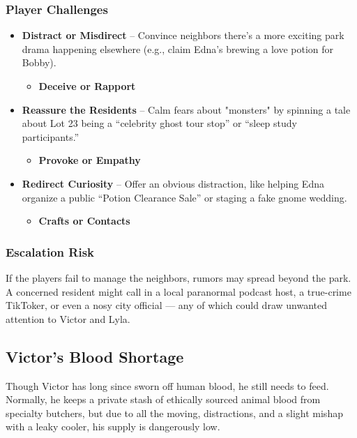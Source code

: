 \subsubsection*{Player Challenges}
\begin{itemize}
    \item \textbf{Distract or Misdirect} – Convince neighbors there’s a more exciting park drama happening elsewhere (e.g., claim Edna’s brewing a love potion for Bobby).
        \begin{itemize}
            \item \textbf{Deceive or Rapport} 
        \end{itemize}

    \item \textbf{Reassure the Residents} – Calm fears about "monsters" by spinning a tale about Lot 23 being a “celebrity ghost tour stop” or “sleep study participants.”
        \begin{itemize}
            \item \textbf{Provoke or Empathy} 
        \end{itemize}

    \item \textbf{Redirect Curiosity} – Offer an obvious distraction, like helping Edna organize a public “Potion Clearance Sale” or staging a fake gnome wedding.
        \begin{itemize}
            \item \textbf{Crafts or Contacts} 
        \end{itemize}
\end{itemize}

\subsubsection*{Escalation Risk}
If the players fail to manage the neighbors, rumors may spread beyond the park. A concerned resident might call in a local paranormal podcast host, a true-crime TikToker, or even a nosy city official — any of which could draw unwanted attention to Victor and Lyla.


\subsection{Victor’s Blood Shortage}

Though Victor has long since sworn off human blood, he still needs to feed. Normally, he keeps a private stash of ethically sourced animal blood from specialty butchers, but due to all the moving, distractions, and a slight mishap with a leaky cooler, his supply is dangerously low.

